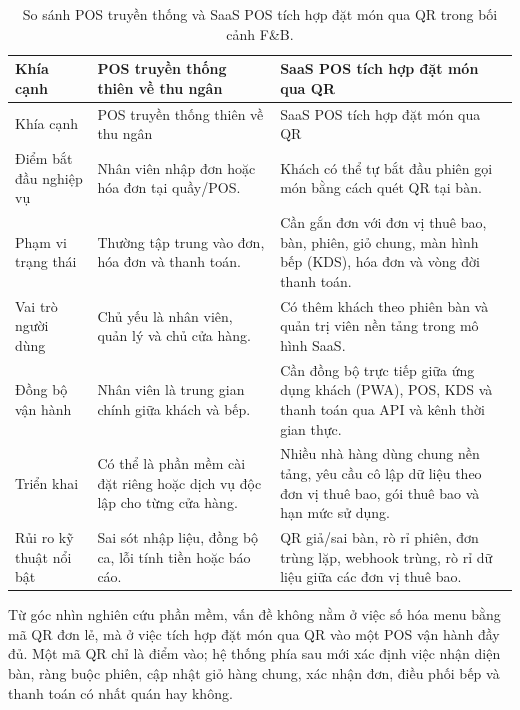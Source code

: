 {\footnotesize\sloppy
\setlength{\tabcolsep}{3pt}
\begin{longtable}{>{\raggedright\arraybackslash}p{}>{\raggedright\arraybackslash}p{}>{\raggedright\arraybackslash}p{}}
  \caption{So sánh POS truyền thống và SaaS POS tích hợp đặt món qua QR trong bối cảnh F\&B.}
  \label{tab:chapter2-pos-qr-comparison}\\
  \toprule
  Khía cạnh & POS truyền thống thiên về thu ngân & SaaS POS tích hợp đặt món qua QR \\
  \midrule
  \endfirsthead
  \toprule
  Khía cạnh & POS truyền thống thiên về thu ngân & SaaS POS tích hợp đặt món qua QR \\
  \midrule
  \endhead
  \bottomrule
  \endfoot
  Điểm bắt đầu nghiệp vụ & Nhân viên nhập đơn hoặc hóa đơn tại quầy/POS. & Khách có thể tự bắt đầu phiên gọi món bằng cách quét QR tại bàn. \\
  \addlinespace
  Phạm vi trạng thái & Thường tập trung vào đơn, hóa đơn và thanh toán. & Cần gắn đơn với đơn vị thuê bao, bàn, phiên, giỏ chung, màn hình bếp (KDS), hóa đơn và vòng đời thanh toán. \\
  \addlinespace
  Vai trò người dùng & Chủ yếu là nhân viên, quản lý và chủ cửa hàng. & Có thêm khách theo phiên bàn và quản trị viên nền tảng trong mô hình SaaS. \\
  \addlinespace
  Đồng bộ vận hành & Nhân viên là trung gian chính giữa khách và bếp. & Cần đồng bộ trực tiếp giữa ứng dụng khách (PWA), POS, KDS và thanh toán qua API và kênh thời gian thực. \\
  \addlinespace
  Triển khai & Có thể là phần mềm cài đặt riêng hoặc dịch vụ độc lập cho từng cửa hàng. & Nhiều nhà hàng dùng chung nền tảng, yêu cầu cô lập dữ liệu theo đơn vị thuê bao, gói thuê bao và hạn mức sử dụng. \\
  \addlinespace
  Rủi ro kỹ thuật nổi bật & Sai sót nhập liệu, đồng bộ ca, lỗi tính tiền hoặc báo cáo. & QR giả/sai bàn, rò rỉ phiên, đơn trùng lặp, webhook trùng, rò rỉ dữ liệu giữa các đơn vị thuê bao. \\
\end{longtable}
}

Từ góc nhìn nghiên cứu phần mềm, vấn đề không nằm ở việc số hóa menu bằng mã QR đơn lẻ, mà ở việc tích hợp đặt món qua QR vào một POS vận hành đầy đủ. Một mã QR chỉ là điểm vào; hệ thống phía sau mới xác định việc nhận diện bàn, ràng buộc phiên, cập nhật giỏ hàng chung, xác nhận đơn, điều phối bếp và thanh toán có nhất quán hay không.

